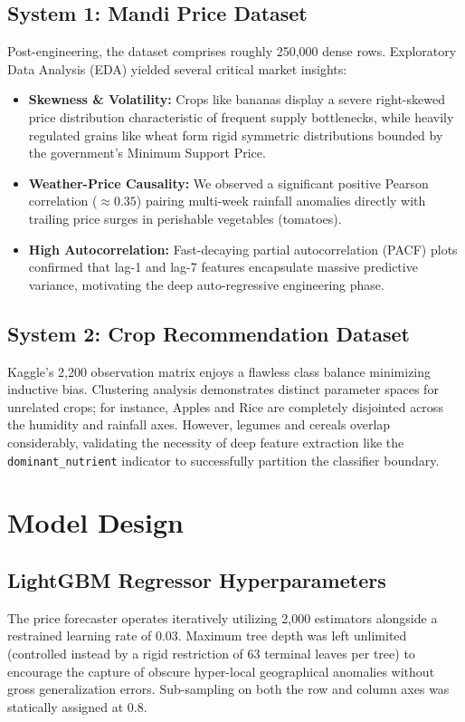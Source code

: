 \documentclass[conference]{IEEEtran}
\begin{document}
\subsection{System 1: Mandi Price Dataset}
Post-engineering, the dataset comprises roughly 250,000 dense rows. Exploratory Data Analysis (EDA) yielded several critical market insights:
\begin{itemize}
    \item \textbf{Skewness & Volatility:} Crops like bananas display a severe right-skewed price distribution characteristic of frequent supply bottlenecks, while heavily regulated grains like wheat form rigid symmetric distributions bounded by the government's Minimum Support Price.
    \item \textbf{Weather-Price Causality:} We observed a significant positive Pearson correlation ($\approx 0.35$) pairing multi-week rainfall anomalies directly with trailing price surges in perishable vegetables (tomatoes).
    \item \textbf{High Autocorrelation:} Fast-decaying partial autocorrelation (PACF) plots confirmed that lag-1 and lag-7 features encapsulate massive predictive variance, motivating the deep auto-regressive engineering phase.
\end{itemize}

\subsection{System 2: Crop Recommendation Dataset}
Kaggle's 2,200 observation matrix enjoys a flawless class balance minimizing inductive bias. 
Clustering analysis demonstrates distinct parameter spaces for unrelated crops; for instance, Apples and Rice are completely disjointed across the humidity and rainfall axes. However, legumes and cereals overlap considerably, validating the necessity of deep feature extraction like the \texttt{dominant\_nutrient} indicator to successfully partition the classifier boundary.

\section{Model Design}

\subsection{LightGBM Regressor Hyperparameters}
The price forecaster operates iteratively utilizing 2,000 estimators alongside a restrained learning rate of 0.03. Maximum tree depth was left unlimited (controlled instead by a rigid restriction of 63 terminal leaves per tree) to encourage the capture of obscure hyper-local geographical anomalies without gross generalization errors. Sub-sampling on both the row and column axes was statically assigned at 0.8.
\end{document}
